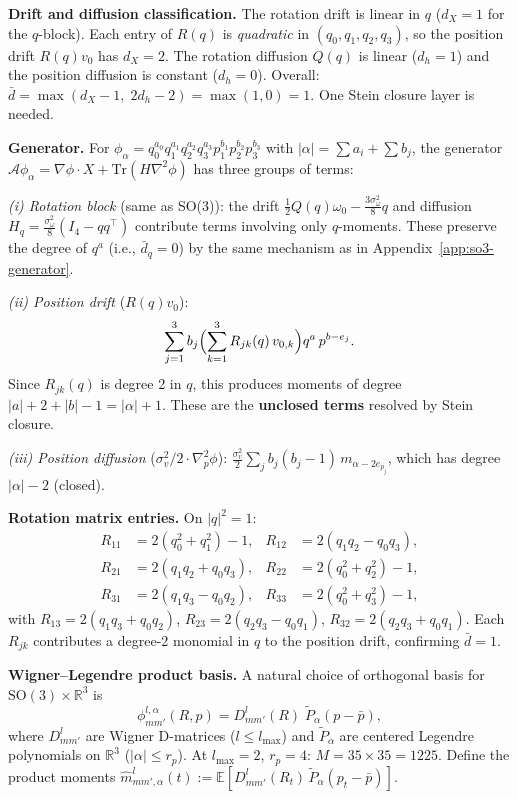 \documentclass{article}
\newcommand{\R}{\mathbb{R}}
\newcommand{\E}{\mathbb{E}}
\theoremstyle{definition}
\begin{document}
\textbf{Drift and diffusion classification.}
The rotation drift is linear in $q$ ($d_X = 1$ for the $q$-block).
Each entry of $R(q)$ is \emph{quadratic} in $(q_0, q_1, q_2, q_3)$,
so the position drift $R(q)v_0$ has $d_X = 2$.
The rotation diffusion $Q(q)$ is linear ($d_h = 1$) and
the position diffusion is constant ($d_h = 0$).
Overall:
$\bar{d} = \max(d_X - 1,\; 2d_h - 2) = \max(1, 0) = 1$.
One Stein closure layer is needed.

\textbf{Generator.}
For $\phi_\alpha = q_0^{a_0} q_1^{a_1} q_2^{a_2} q_3^{a_3}
p_1^{b_1} p_2^{b_2} p_3^{b_3}$
with $|\alpha| = \sum a_i + \sum b_j$, the generator
$\mathcal{A}\phi_\alpha = \nabla\phi \cdot X + \mathrm{Tr}(H\nabla^2\phi)$
has three groups of terms:

\emph{(i) Rotation block} (same as SO(3)):
the drift $\frac{1}{2}Q(q)\omega_0 - \frac{3\sigma_\omega^2}{8}q$
and diffusion $H_q = \frac{\sigma_\omega^2}{8}(I_4 - qq^\top)$
contribute terms involving only $q$-moments.
These preserve the degree of $q^a$ (i.e., $\bar{d}_q = 0$)
by the same mechanism as in Appendix~\ref{app:so3-generator}.

\emph{(ii) Position drift} ($R(q)v_0$):
\begin{equation}
    \sum_{j=1}^3 b_j \Bigl(\sum_{k=1}^3 R_{jk}(q)\, v_{0,k}\Bigr)
    q^a\, p^{b - e_j}.
\end{equation}
Since $R_{jk}(q)$ is degree 2 in $q$, this produces moments of degree
$|a| + 2 + |b| - 1 = |\alpha| + 1$.
These are the \textbf{unclosed terms} resolved by Stein closure.

\emph{(iii) Position diffusion} ($\sigma_v^2/2 \cdot \nabla_p^2\phi$):
$\frac{\sigma_v^2}{2} \sum_j b_j(b_j{-}1)\, m_{\alpha - 2e_{p_j}}$,
which has degree $|\alpha| - 2$ (closed).

\textbf{Rotation matrix entries.}
On $|q|^2 = 1$:
\begin{align}
    R_{11} &= 2(q_0^2 + q_1^2) - 1, &
    R_{12} &= 2(q_1 q_2 - q_0 q_3), \nonumber\\
    R_{21} &= 2(q_1 q_2 + q_0 q_3), &
    R_{22} &= 2(q_0^2 + q_2^2) - 1, \nonumber\\
    R_{31} &= 2(q_1 q_3 - q_0 q_2), &
    R_{33} &= 2(q_0^2 + q_3^2) - 1,
\end{align}
with $R_{13} = 2(q_1 q_3 + q_0 q_2)$,
$R_{23} = 2(q_2 q_3 - q_0 q_1)$,
$R_{32} = 2(q_2 q_3 + q_0 q_1)$.
Each $R_{jk}$ contributes a degree-2 monomial in $q$ to the
position drift, confirming $\bar{d} = 1$.

\textbf{Wigner--Legendre product basis.}
A natural choice of orthogonal basis for $\mathrm{SO}(3) \times \R^3$ is
\begin{equation}\label{eq:se3-wl-basis}
    \phi^{l,\alpha}_{mm'}(R, p)
    = D^l_{mm'}(R)\;\widetilde{P}_\alpha(p - \bar{p}),
\end{equation}
where $D^l_{mm'}$ are Wigner D-matrices ($l \le l_{\max}$)
and $\widetilde{P}_\alpha$ are centered Legendre polynomials
on $\R^3$ ($|\alpha| \le r_p$).
At $l_{\max} = 2$, $r_p = 4$: $M = 35 \times 35 = 1225$.
Define the product moments
$\hat{m}^l_{mm',\alpha}(t) := \E[D^l_{mm'}(R_t)\,\widetilde{P}_\alpha(p_t {-} \bar{p})]$.
\end{document}
